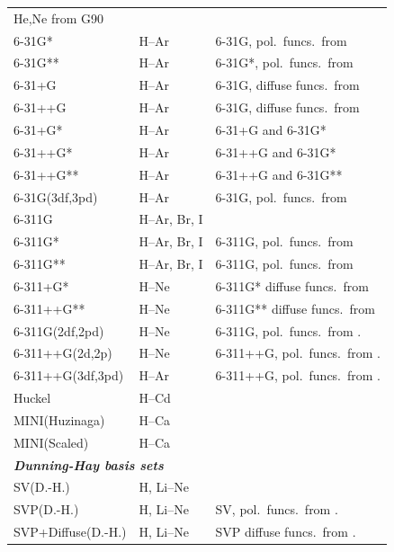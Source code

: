\begin{longtable}{lll}
   He,Ne from G90 \\
6-31G* & H--Ar & 6-31G, pol.\ funcs.\ from
  \cite{pchjaptca28,mmfwjpwjhjsbmsgdjdjapjcp77}\\
6-31G** & H--Ar  & 6-31G*, pol.\ funcs.\ from
  \cite{pchjaptca28}\\
6-31+G & H--Ar & 6-31G, diffuse funcs.\ from
  \cite{tcjcgwsprsjcc4}\\
6-31++G & H--Ar & 6-31G, diffuse funcs.\ from
  \cite{tcjcgwsprsjcc4}\\
6-31+G*   & H--Ar & 6-31+G and 6-31G*\\
6-31++G*  & H--Ar & 6-31++G and 6-31G*\\
6-31++G** & H--Ar & 6-31++G and 6-31G**\\
6-31G(3df,3pd) & H--Ar & 6-31G, pol.\ funcs.\ from
  \cite{mjfjapjsbjcp80}\\
6-311G & H--Ar, Br, I & \cite{rkjsbrsjapjcp72,admgscjcp72,
   lacmpmjpbnedrcblrjcp103,mngapmpmlrjcp103}\\
6-311G* & H--Ar, Br, I & 6-311G, pol.\ funcs.\ from
  \cite{rkjsbrsjapjcp72,lacmpmjpbnedrcblrjcp103}\\
6-311G** & H--Ar, Br, I & 6-311G, pol.\ funcs.\ from
  \cite{rkjsbrsjapjcp72,lacmpmjpbnedrcblrjcp103}\\
6-311+G* & H--Ne & 6-311G* diffuse funcs.\ from 
  \cite{tcjcgwsprsjcc4}\\
6-311++G** & H--Ne & 6-311G** diffuse funcs.\ from
  \cite{tcjcgwsprsjcc4}\\
6-311G(2df,2pd) & H--Ne & 6-311G, pol.\ funcs.\ from
  \cite{mjfjapjsbjcp80}.\\
6-311++G(2d,2p) & H--Ne & 6-311++G, pol.\ funcs.\ from
  \cite{mjfjapjsbjcp80}.\\
6-311++G(3df,3pd) & H--Ar & 6-311++G, pol.\ funcs.\ from
  \cite{mjfjapjsbjcp80}.\\
\hline
%
Huckel & H--Cd & \\
MINI(Huzinaga) & H--Ca & \cite{huzinagabasis} \\
MINI(Scaled) & H--Ca & \cite{huzinagabasis,htshjcc1} \\
\hline
%
\multicolumn{3}{l}{\bf{\emph{Dunning-Hay basis sets}}} \\
SV(D.-H.) & H, Li--Ne & \cite{thdpjhhfs1977} \\
SVP(D.-H.) & H, Li--Ne & SV, pol.\ funcs.\ from
  \cite{thdpjhhfs1977,emhfsjcp83}.\\
SVP+Diffuse(D.-H.) & H, Li--Ne & SVP diffuse funcs.\ from
  \cite{thdpjhhfs1977,emhfsjcp83}.\\

\end{longtable}
